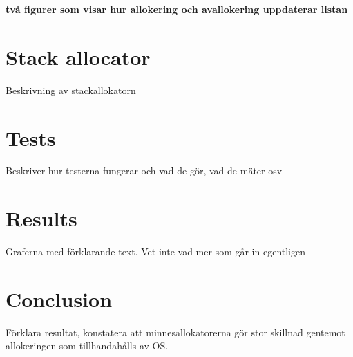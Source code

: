 \documentclass{article}
\begin{document}
\textbf{två figurer som visar hur allokering och avallokering uppdaterar listan}

\section{Stack allocator}
Beskrivning av stackallokatorn

\section{Tests}
Beskriver hur testerna fungerar och vad de gör, vad de mäter osv

\section{Results}
Graferna med förklarande text. Vet inte vad mer som går in egentligen

\section{Conclusion}
Förklara resultat, konstatera att minnesallokatorerna gör stor skillnad gentemot allokeringen som tillhandahålls av OS.
\end{document}
